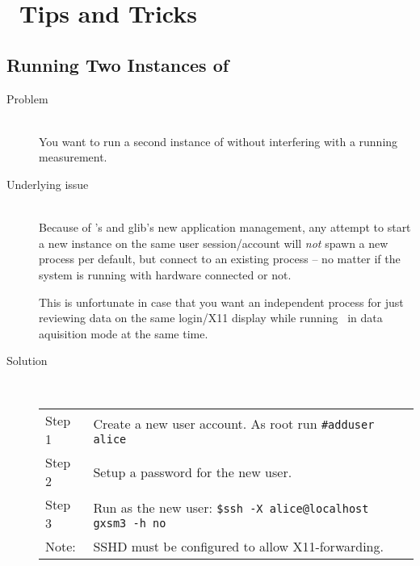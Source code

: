 
\chapter{\Gxsm\ Tips and Tricks}
\label{cha:Gxsm-hacks}
\section{Running Two Instances of \Gxsm}

\begin{description}
  \item[Problem] \mbox{}\\ You want to run a second instance of
	\Gxsm{} without interfering with a running measurement.
  \item[Underlying issue] \mbox{}\\ 
	Because of \Gxsm's and glib's new application management, any attempt
	to start a new instance on the same user session/account will
	\emph{not} spawn a new process per default, but connect to an existing
	\Gxsm{} process -- no matter if the system is running with hardware
	connected or not.

	This is unfortunate in case that you want an independent process for
	just reviewing data on the same login/X11 display while running \Gxsm\
	in data aquisition mode at the same time.
  \item[Solution] \mbox{}\\ 
\begin{tabular}{ll}
	Step 1 & Create a new user account. As root run \texttt{\#adduser alice}\\
	Step 2 & Setup a password for the new user.\\
	Step 3 & Run as the new user: \texttt{\$ssh -X alice@localhost gxsm3 -h no} \\
	Note: & SSHD must be configured to allow X11-forwarding.
\end{tabular}
\end{description}

